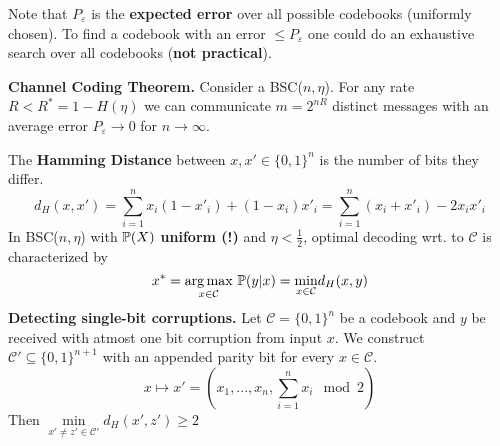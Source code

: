  Note that \(P_\varepsilon\) is the \textbf{expected error} over all possible codebooks (uniformly chosen). 
 To find a codebook with an error \(\leq P_\varepsilon\) one could do an exhaustive search over 
 all codebooks (\textbf{not practical}).

\vspace*{1mm}
 \textbf{Channel Coding Theorem.} Consider a BSC(\(n, \eta\)). For any rate \(R < R^* = 1- H(\eta)\) we can 
 communicate \(m = 2^{nR}\) distinct messages with an average error \(P_\varepsilon \to 0\) for \(n \to \infty\). 

 The \textbf{Hamming Distance} between \(x, x' \in \{0,1\}^n\) is the number of bits they differ.
 \[d_H(x, x') = \sum_{i = 1}^n x_i(1-x'_i)+(1-x_i)x'_i = \sum_{i = 1}^n (x_i + x'_i)-2x_ix'_i\]
In BSC(\(n, \eta\)) with \(\P(X)\) \textbf{uniform (!)} and \(\eta < \frac{1}{2}\), optimal 
decoding wrt. to \(\mathcal{C}\) is characterized by \[x^* = \underset{x \in \mathcal{C}}{\arg \max} \ \P(y|x) = \underset{x \in \mathcal{C}}{\min} d_H(x, y)\] 
\textbf{Detecting single-bit corruptions.}
Let \(\mathcal{C} = \{0, 1\}^n\) be a codebook and \(y\) be received with atmost one bit corruption from input \(x\).
We construct \(\mathcal{C}' \subseteq \{0,1\}^{n+1}\) with an appended parity bit for every \(x \in \mathcal{C}\).
\[x \mapsto x' = \left(x_1, ..., x_n, \sum_{i = 1}^n x_i \mod 2\right)\]
Then \(\underset{x'\neq z' \in \mathcal{C}'}{\min} d_H(x', z') \geq 2\)
